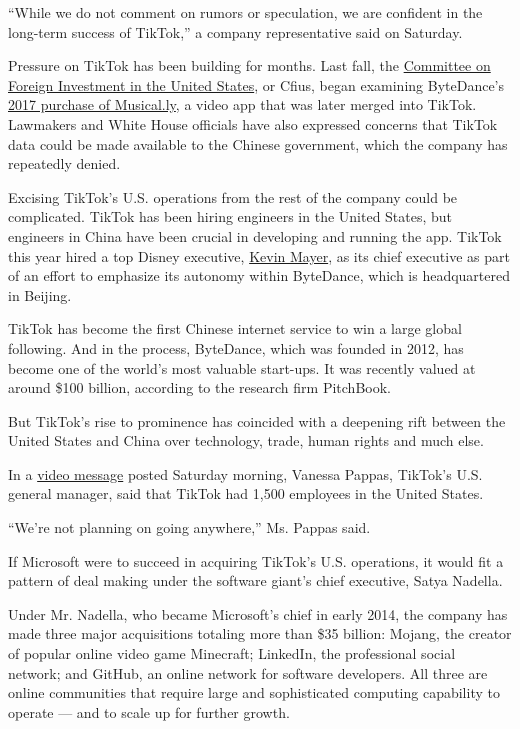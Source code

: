 ``While we do not comment on rumors or speculation, we are confident in
the long-term success of TikTok,'' a company representative said on
Saturday.

Pressure on TikTok has been building for months. Last fall, the
\href{https://www.nytimes.com/2019/11/01/technology/tiktok-national-security-review.html}{Committee
on Foreign Investment in the United States}, or Cfius, began examining
ByteDance's
\href{https://www.nytimes.com/2017/11/10/business/dealbook/musically-sold-app-video.html}{2017
purchase of Musical.ly}, a video app that was later merged into TikTok.
Lawmakers and White House officials have also expressed concerns that
TikTok data could be made available to the Chinese government, which the
company has repeatedly denied.

Excising TikTok's U.S. operations from the rest of the company could be
complicated. TikTok has been hiring engineers in the United States, but
engineers in China have been crucial in developing and running the app.
TikTok this year hired a top Disney executive,
\href{https://www.nytimes.com/2020/05/18/business/media/tiktok-ceo-kevin-mayer.html}{Kevin
Mayer}, as its chief executive as part of an effort to emphasize its
autonomy within ByteDance, which is headquartered in Beijing.

TikTok has become the first Chinese internet service to win a large
global following. And in the process, ByteDance, which was founded in
2012, has become one of the world's most valuable start-ups. It was
recently valued at around \$100 billion, according to the research firm
PitchBook.

But TikTok's rise to prominence has coincided with a deepening rift
between the United States and China over technology, trade, human rights
and much else.

In a
\href{https://twitter.com/tiktok_us/status/1289565422350553091}{video
message} posted Saturday morning, Vanessa Pappas, TikTok's U.S. general
manager, said that TikTok had 1,500 employees in the United States.

``We're not planning on going anywhere,'' Ms. Pappas said.

If Microsoft were to succeed in acquiring TikTok's U.S. operations, it
would fit a pattern of deal making under the software giant's chief
executive, Satya Nadella.

Under Mr. Nadella, who became Microsoft's chief in early 2014, the
company has made three major acquisitions totaling more than \$35
billion: Mojang, the creator of popular online video game Minecraft;
LinkedIn, the professional social network; and GitHub, an online network
for software developers. All three are online communities that require
large and sophisticated computing capability to operate --- and to scale
up for further growth.

